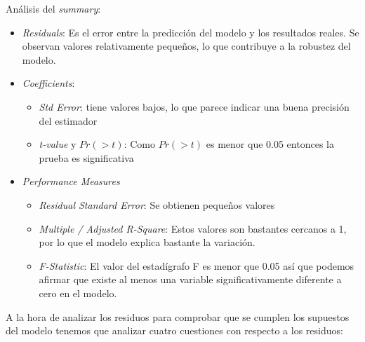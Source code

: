 \documentclass[a4paper,10pt,twocolumn]{report}
\begin{document}
	Análisis del \textit{summary}:
	\begin{itemize}
		\item \textit{Residuals}: Es el error entre la predicción del modelo y los resultados reales. Se observan valores relativamente pequeños, lo que contribuye a la robustez del modelo.
		\item \textit{Coefficients}: 
		\begin{itemize}
			\item \textit{Std Error}: tiene valores bajos, lo que parece indicar una buena precisión del estimador
			\item \textit{t-value} y $Pr(>t)$: Como $Pr(>t)$ es menor que 0.05 entonces la prueba es significativa   
		\end{itemize}
		\item \textit{Performance Measures}
		\begin{itemize}
			\item \textit{Residual Standard Error}: Se obtienen pequeños valores
			\item \textit{Multiple / Adjusted R-Square}: Estos valores son bastantes cercanos a 1, por lo que el modelo explica bastante la variación.
			\item \textit{F-Statistic}: El valor del estadígrafo F es menor que 0.05 así que podemos afirmar que existe al menos una variable significativamente diferente a cero en el modelo.
		\end{itemize}
	\end{itemize}
	
	A la hora de analizar los residuos para comprobar que se cumplen los supuestos del modelo tenemos que analizar cuatro cuestiones con respecto a los residuos:
	
\end{document}
